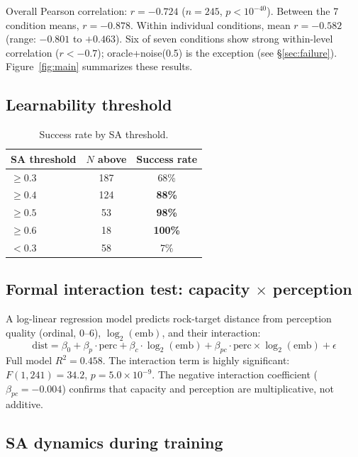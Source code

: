 \documentclass{article}
\begin{document}
Overall Pearson correlation: $r = -0.724$ ($n=245$, $p < 10^{-40}$). Between the
7 condition means, $r = -0.878$. Within individual conditions, mean $r = -0.582$
(range: $-0.801$ to $+0.463$). Six of seven conditions show strong within-level
correlation ($r < -0.7$); oracle+noise(0.5) is the exception (see
\S\ref{sec:failure}). Figure~\ref{fig:main} summarizes these results.

\subsection{Learnability threshold}
\label{sec:threshold}

\begin{table}[h]
\centering
\caption{Success rate by SA threshold.}
\label{tab:threshold}
\begin{tabular}{lcc}
\toprule
SA threshold & $N$ above & Success rate \\
\midrule
$\geq 0.3$ & 187 & 68\% \\
$\geq 0.4$ & 124 & \textbf{88\%} \\
$\geq 0.5$ & 53 & \textbf{98\%} \\
$\geq 0.6$ & 18 & \textbf{100\%} \\
$< 0.3$ & 58 & 7\% \\
\bottomrule
\end{tabular}
\end{table}

\subsection{Formal interaction test: capacity $\times$ perception}

A log-linear regression model predicts rock-target distance from perception
quality (ordinal, 0--6), $\log_2(\text{emb})$, and their interaction:
\begin{equation}
\text{dist} = \beta_0 + \beta_p \cdot \text{perc} + \beta_c \cdot \log_2(\text{emb}) + \beta_{pc} \cdot \text{perc} \times \log_2(\text{emb}) + \epsilon
\end{equation}
Full model $R^2 = 0.458$. The interaction term is highly significant:
$F(1, 241) = 34.2$, $p = 5.0 \times 10^{-9}$. The negative interaction
coefficient ($\beta_{pc} = -0.004$) confirms that capacity and perception are
multiplicative, not additive.

\subsection{SA dynamics during training}
\end{document}
